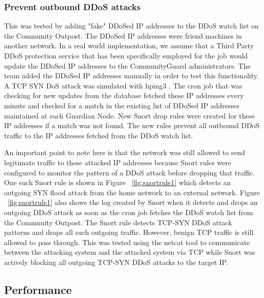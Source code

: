 \subsubsection{Prevent outbound DDoS attacks}
\label{sec:eval:outddos}

This was tested by adding "fake" DDoSed IP addresses to the DDoS watch list on the Community Outpost. The DDoSed IP addresses were friend machines in another network. In a real world implementation, we assume that a Third Party DDoS protection service \cite{DDoSPreventionTools} that has been specifically employed for the job would update the DDoSed IP addresses to the CommunityGuard administrators. The team added the DDoSed IP addresses manually in order to test this functionality. A TCP SYN DoS attack was simulated with hping3 \cite{hpingReferralPaper} \cite{hping}.  The cron job that was checking for new updates from the database fetched these IP addresses every minute and checked for a match in the existing list of DDoSed IP addresses maintained at each Guardian Node. New Snort drop rules were created for these IP addresses if a match was not found. The new rules prevent all outbound DDoS traffic to the IP addresses fetched from the DDoS watch list. 

An important point to note here is that the network was still allowed to send legitimate traffic to these attacked IP addresses because Snort rules were configured to monitor the pattern of a DDoS attack before dropping that traffic. One such Snort rule is shown in Figure ~\ref{fig:snortrule1} which detects an outgoing SYN flood attack from the home network to an external network. Figure ~\ref{fig:snortrule1} also shows the log created by Snort when it detects and drops an outgoing DDoS attack as soon as the cron job fetches the DDoS watch list from the Community Outpost. The Snort rule detects TCP-SYN DDoS attack patterns and drops all such outgoing traffic. However, benign TCP traffic is still allowed to pass through. This was tested using the netcat tool \cite{netcat} to communicate between the attacking system and the attacked system via TCP while Snort was actively blocking all outgoing TCP-SYN DDoS attacks to the target IP.

\subsection{Performance}
